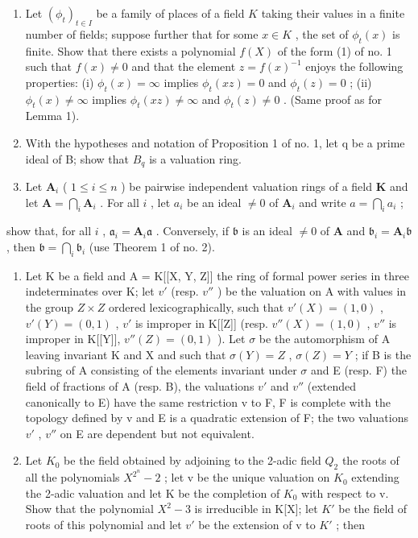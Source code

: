 
\begin{enumerate}
\def\labelenumi{\arabic{enumi}.}
\item
  Let \((\phi_{t})_{t\in I}\) be a family of places of a field \(K\) taking their values in a finite number of fields; suppose further that for some \(x\in K\) , the set of \(\phi_t(x)\) is finite. Show that there exists a polynomial \(f(X)\) of the form (1) of no. 1 such that \(f(x)\neq 0\) and that the element \(z = f(x)^{-1}\) enjoys the following properties: (i) \(\phi_t(x) = \infty\) implies \(\phi_t(xz) = 0\) and \(\phi_t(z) = 0\) ; (ii) \(\phi_t(x)\neq \infty\) implies \(\phi_t(xz)\neq \infty\) and \(\phi_t(z)\neq 0\) . (Same proof as for Lemma 1).
\item
  With the hypotheses and notation of Proposition 1 of no. 1, let q be a prime ideal of B; show that \(B_{q}\) is a valuation ring.
\item
  Let \(\mathbf{A}_i\) ( \(1 \leqslant i \leqslant n\) ) be pairwise independent valuation rings of a field \(\mathbf{K}\) and let \(\mathbf{A} = \bigcap_{i} \mathbf{A}_i\) . For all \(i\) , let \(a_i\) be an ideal \(\neq 0\) of \(\mathbf{A}_i\) and write \(a = \bigcap_{i} a_i\) ;
\end{enumerate}

show that, for all \(i\) , \(\mathfrak{a}_i = \mathbf{A}_i\mathfrak{a}\) . Conversely, if \(\mathfrak{b}\) is an ideal \(\neq 0\) of \(\mathbf{A}\) and \(\mathfrak{b}_i = \mathbf{A}_i\mathfrak{b}\) , then \(\mathfrak{b} = \bigcap_i \mathfrak{b}_i\) (use Theorem 1 of no. 2).


\begin{enumerate}
\def\labelenumi{\arabic{enumi}.}
\item
  Let K be a field and A = K{[}{[}X, Y, Z{]}{]} the ring of formal power series in three indeterminates over K; let \(v'\) (resp. \(v''\) ) be the valuation on A with values in the group \(Z \times Z\) ordered lexicographically, such that \(v'(X) = (1, 0)\) , \(v'(Y) = (0, 1)\) , \(v'\) is improper in K{[}{[}Z{]}{]} (resp. \(v''(X) = (1, 0)\) , \(v''\) is improper in K{[}{[}Y{]}{]}, \(v''(Z) = (0, 1)\) ). Let \(\sigma\) be the automorphism of A leaving invariant K and X and such that \(\sigma(Y) = Z\) , \(\sigma(Z) = Y\) ; if B is the subring of A consisting of the elements invariant under \(\sigma\) and E (resp. F) the field of fractions of A (resp. B), the valuations \(v'\) and \(v''\) (extended canonically to E) have the same restriction v to F, F is complete with the topology defined by v and E is a quadratic extension of F; the two valuations \(v'\) , \(v''\) on E are dependent but not equivalent.
\item
  Let \(K_{0}\) be the field obtained by adjoining to the 2-adic field \(Q_{2}\) the roots of all the polynomials \(X^{2^{n}} - 2\) ; let v be the unique valuation on \(K_{0}\) extending the 2-adic valuation and let K be the completion of \(K_{0}\) with respect to v. Show that the polynomial \(X^{2} - 3\) is irreducible in K{[}X{]}; let \(K'\) be the field of roots of this polynomial and let \(v'\) be the extension of v to \(K'\) ; then
\end{enumerate}

